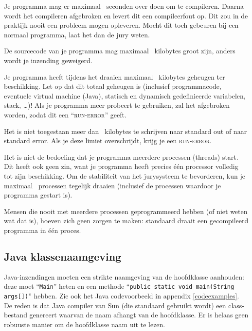 \begin{description}
\item[compile-tijd]
Je programma mag er maximaal \COMPILETIME\ seconden over doen om te
compileren. Daarna wordt het compileren afgebroken en levert dit een
compileerfout op. Dit zou in de praktijk nooit een probleem mogen
opleveren. Mocht dit toch gebeuren bij een normaal programma, laat het
dan de jury weten.

\item[sourcegrootte]
De sourcecode van je programma mag maximaal \SOURCESIZE\ kilobytes
groot zijn, anders wordt je inzending geweigerd.

\item[geheugen]
Je programma heeft tijdens het draaien maximaal \MEMLIMIT\ kilobytes
geheugen ter beschikking. Let op dat dit totaal geheugen is (inclusief
programmacode, eventuele virtual machine (Java), statisch en dynamisch
gedefinieerde variabelen, stack, \dots)! Als je programma meer
probeert te gebruiken, zal het afgebroken worden, zodat dit een
``\textsc{run-error}'' geeft.

\item[uitvoergrootte]
Het is niet toegestaan meer dan \FILELIMIT\ kilobytes te schrijven naar
standard out of naar standard error. Als je deze limiet overschrijdt,
krijg je een \textsc{run-error}.

\item[aantal processen]
Het is niet de bedoeling dat je programma meerdere processen (threads)
start. Dit heeft ook geen zin, want je programma heeft precies \'e\'en
processor volledig tot zijn beschikking. Om de stabiliteit van het
jurysysteem te bevorderen, kun je maximaal \PROCLIMIT\ processen
tegelijk draaien (inclusief de processen waardoor je programma
gestart is).

Mensen die nooit met meerdere processen geprogrammeerd hebben (of
niet weten wat dat is), hoeven zich geen zorgen te maken: standaard
draait een gecompileerd programma in \'e\'en proces.

\end{description}

\subsection{Java klassenaamgeving}

Java-inzendingen moeten een strikte naamgeving van de hoofdklasse
aanhouden: deze moet ``\verb!Main!'' heten en een methode
``\verb!public static void main(String args[])!'' hebben. Zie ook het
Java codevoorbeeld in appendix \ref{codeexamples}. De reden is dat
Java compiler van Sun (die standaard gebruikt wordt) een class-bestand
genereert waarvan de naam afhangt van de hoofdklasse. Er is helaas
geen robuuste manier om de hoofdklasse naam uit te lezen.

